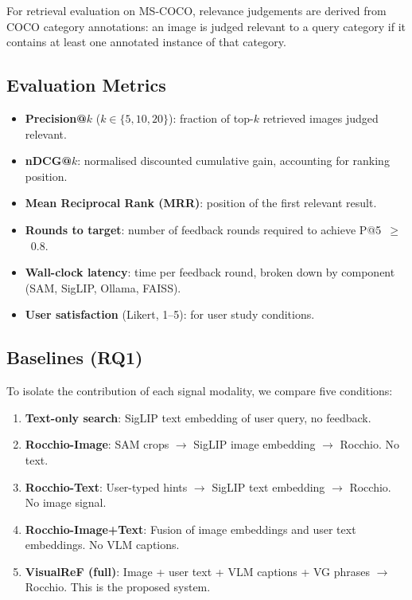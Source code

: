 \documentclass[12pt,a4paper]{article}
\begin{document}
For retrieval evaluation on MS-COCO, relevance judgements are derived from
COCO category annotations: an image is judged relevant to a query category if
it contains at least one annotated instance of that category.

\subsection{Evaluation Metrics}

\begin{itemize}[leftmargin=1.5em]
  \item \textbf{Precision@$k$} ($k \in \{5, 10, 20\}$): fraction of top-$k$
        retrieved images judged relevant.
  \item \textbf{nDCG@$k$}: normalised discounted cumulative gain, accounting
        for ranking position.
  \item \textbf{Mean Reciprocal Rank (MRR)}: position of the first relevant
        result.
  \item \textbf{Rounds to target}: number of feedback rounds required to
        achieve P@5~$\geq$~0.8.
  \item \textbf{Wall-clock latency}: time per feedback round, broken down by
        component (SAM, SigLIP, Ollama, FAISS).
  \item \textbf{User satisfaction} (Likert, 1--5): for user study conditions.
\end{itemize}

\subsection{Baselines (RQ1)}

To isolate the contribution of each signal modality, we compare five
conditions:

\begin{enumerate}[leftmargin=1.5em]
  \item \textbf{Text-only search}: SigLIP text embedding of user query, no
        feedback.
  \item \textbf{Rocchio-Image}: SAM crops $\to$ SigLIP image embedding $\to$
        Rocchio. No text.
  \item \textbf{Rocchio-Text}: User-typed hints $\to$ SigLIP text embedding
        $\to$ Rocchio. No image signal.
  \item \textbf{Rocchio-Image+Text}: Fusion of image embeddings and user text
        embeddings. No VLM captions.
  \item \textbf{VisualReF (full)}: Image + user text + VLM captions + VG
        phrases $\to$ Rocchio. This is the proposed system.
\end{enumerate}
\end{document}
